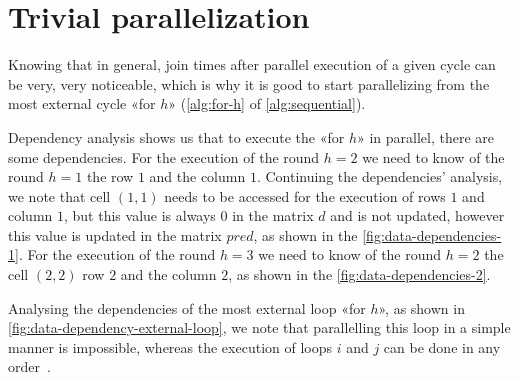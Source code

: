 \section{Trivial parallelization}\label{trivial_parallelization}

Knowing that in general, join times after parallel execution of a given cycle can be very, very noticeable, which is why it is good to start parallelizing from the most external cycle «for \(h\)» (\cref{alg:for-h} of \cref{alg:sequential}).

Dependency analysis shows us that to execute the «for \(h\)»  in parallel, there are some dependencies. For the execution of the round \(h=2\) we need to know of the round \(h=1\) the row \(1\) and the column \(1\). Continuing the dependencies' analysis, we note that cell \((1,1)\) needs to be accessed for the execution of rows \(1\) and column \(1\), but this value is always \(0\) in the matrix \(d\) and is not updated, however this value is updated in the matrix \(pred\), as shown in the \cref{fig:data-dependencies-1}.
For the execution of the round \(h=3\) we need to know of the round \(h=2\) the cell \((2,2)\) row \(2\) and the column \(2\), as shown in the \cref{fig:data-dependencies-2}.

Analysing the dependencies of the most external loop «for \(h\)», as shown in \cref{fig:data-dependency-external-loop}, we note that parallelling this loop in a simple manner is impossible, whereas the execution of loops \(i\) and \(j\) can be done in any order~\cite{rucci}.

